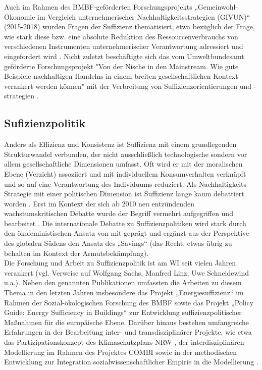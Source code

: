 \documentclass[a4paper,11pt,twoside]{scrartcl}
\begin{document}
Auch im Rahmen des BMBF-geförderten Forschungsprojekts „Gemeinwohl-Ökonomie im Vergleich unternehmerischer Nachhaltigkeitsstrategien (GIVUN)“ (2015-2018) wurden Fragen der Suffizienz thematisiert, etwa bezüglich der Frage, wie stark diese bzw. eine absolute Reduktion des Ressourcenverbrauchs von verschiedenen Instrumenten unternehmerischer Verantwortung adressiert und eingefordert wird \cite{Sommer2016b}.
Nicht zuletzt beschäftigte sich das vom Umweltbundesamt geförderte Forschungsprojekt "Von der Nische in den Mainstream. Wie gute Beispiele nachhaltigen Handelns in einem breiten gesellschaftlichen Kontext verankert werden können" mit der Verbreitung von Suffizienzorientierungen und -strategien \cite{Kny2015}.
    
\subsection*{Sufizienzpolitik}

Anders als Effizienz und Konsistenz ist Suffizienz mit einem grundlegenden Strukturwandel verbunden, der nicht ausschließlich technologische sondern vor allem gesellschaftliche Dimensionen umfasst. Oft wird er mit der moralischen Ebene (Verzicht) assoziiert und mit individuellem Konsumverhalten verknüpft und so auf eine Verantwortung des Individuums reduziert. Als Nachhaltigkeits-Strategie mit einer politischen Dimension ist Suffizienz lange kaum debattiert worden \cite{Winterfeld2002}. Erst im Kontext der sich ab 2010 neu entzündenden wachstumskritischen Debatte wurde der Begriff vermehrt aufgegriffen und bearbeitet \cite{Seidl2010,Raetz2011,Schneidewind2013,Winterfeld2017,Linz2015,Bierwirth2015,Thomas2015,Adler2017}. Die internationale Debatte zu Suffizienzpolitiken wird stark durch den ökofeministischen Ansatz von \cite{Salleh2009} mit geprägt und ergänzt aus der Perspektive des globalen Südens den Ansatz des „Savings“ (das Recht, etwas übrig zu behalten im Kontext der Armutsbekämpfung).\\
Die Forschung und Arbeit zu Suffizienzpolitik ist am WI seit vielen Jahren verankert (vgl. Verweise auf Wolfgang Sachs, Manfred Linz, Uwe Schneidewind u.a.).
Neben den genannten Publikationen umfassten die Arbeiten zu diesem Thema in den letzten Jahren insbesondere das Projekt „Energiesuffizienz“ \cite{Brischke2016} im Rahmen der Sozial-ökologischen Forschung des BMBF sowie das Projekt „Policy Guide: Energy Sufficiency in Buildings“ \cite{EnergySufficiencyProjekt} zur Entwicklung suffizienzpolitischer Maßnahmen für die europäische Ebene.
Darüber hinaus bestehen umfangreiche Erfahrungen in der Bearbeitung inter- und transdisziplinärer Projekte, wie etwa das Partizipationskonzept des Klimaschutzplans NRW \cite{Klimaschutzplan2011,Klimaschutzplan2012}, der interdisziplinären Modellierung im Rahmen des Projektes COMBI \cite{COMBI2015} sowie in der methodischen Entwicklung zur Integration sozialwissenschaftlicher Empirie in die Modellierung \cite{Bierwirth2016}.
\end{document}
